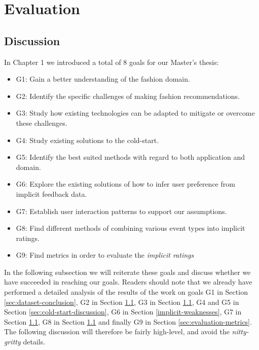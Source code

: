 
\chapter{Evaluation}
\label{chap:resulteval}
\minitoc


\clearpage






\section{Discussion}

In Chapter 1 we introduced a total of 8 goals for our Master's thesis:

\begin{itemize}
\item G1: Gain a better understanding of the fashion domain.
\item G2: Identify the specific challenges of making fashion recommendations.
\item G3: Study how existing technologies can be adapted to mitigate or
  		  overcome these challenges.
\item G4: Study existing solutions to the cold-start.
\item G5: Identify the best suited methods with regard to both application and domain.
\item G6: Explore the existing solutions of how to infer user preference from implicit feedback data.
\item G7: Establish user interaction patterns to support our assumptions.
\item G8: Find different methods of combining various event types into implicit ratings.
\item G9: Find metrics in order to evaluate the \emph{implicit ratings}
\end{itemize}

In the following subsection we will reiterate these goals and discuss whether we have succeeded in reaching our goals. Readers should
note that we already have performed a detailed analysis of the results of the work on goals G1 in Section \ref{sec:dataset-conclusion},
G2 in Section \ref{}, G3 in Section \ref{}, G4 and G5 in Section \ref{sec:cold-start-discussion}, G6 in Section \ref{implicit-weaknesses},
G7 in Section \ref{}, G8 in Section \ref{} and finally G9 in Section \ref{sec:evaluation-metrics}.
The following discussion will therefore be fairly high-level, and avoid the \emph{nitty-gritty} details.

